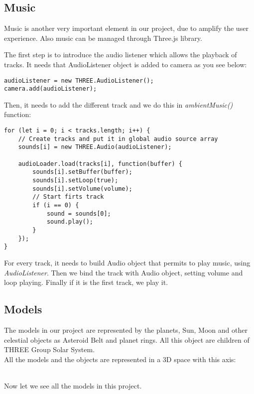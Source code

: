 \documentclass{article}
\begin{document}
\subsection{Music}
Music is another very important element in our project, due to amplify the user experience. Also music can be managed through Three.js library.
\par The first step is to introduce the audio listener which allows the playback of tracks. It needs that AudioListener\cite{documentation:threejs} object is added to camera as you see below:
\begin{lstlisting}
audioListener = new THREE.AudioListener();
camera.add(audioListener);
\end{lstlisting}
\par Then, it needs to add the different track and we do this in \textit{ambientMusic()} function:
\begin{lstlisting}
for (let i = 0; i < tracks.length; i++) {
	// Create tracks and put it in global audio source array
	sounds[i] = new THREE.Audio(audioListener);
	
	audioLoader.load(tracks[i], function(buffer) {
		sounds[i].setBuffer(buffer);
		sounds[i].setLoop(true);
		sounds[i].setVolume(volume);
		// Start firts track
		if (i == 0) {
			sound = sounds[0];
			sound.play();
		}
	});
}
\end{lstlisting}
For every track, it needs to build Audio\cite{documentation:threejs} object that permits to play music, using \textit{AudioListener}. Then we bind the track with Audio object, setting volume and loop playing. Finally if it is the first track, we play it.


\subsection{Models}
The models in our project are represented by the planets, Sun, Moon and other celestial objects as Asteroid Belt and planet rings. All this object are children of THREE Group Solar System.\\
All the models and the objects are represented in a 3D space with this axis:
\\
\\
Now let we see all the models in this project.
\end{document}
